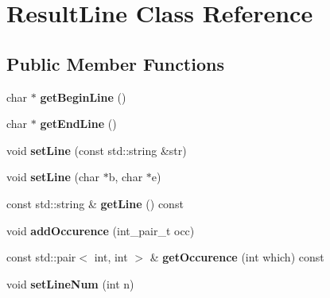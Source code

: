 \hypertarget{class_result_line}{\section{Result\-Line Class Reference}
\label{class_result_line}
}
\subsection*{Public Member Functions}
\begin{DoxyCompactItemize}
\item 
\hypertarget{class_result_line_aa8b7f90ecdf3e2e7d5399051ddaa1a29}{char $\ast$ {\bfseries get\-Begin\-Line} ()}\label{class_result_line_aa8b7f90ecdf3e2e7d5399051ddaa1a29}

\item 
\hypertarget{class_result_line_a0f10dda573d3ff9a71ec6cdaa718bd4f}{char $\ast$ {\bfseries get\-End\-Line} ()}\label{class_result_line_a0f10dda573d3ff9a71ec6cdaa718bd4f}

\item 
\hypertarget{class_result_line_a0779d1fa9dc3476982c93731ca233a88}{void {\bfseries set\-Line} (const std\-::string \&str)}\label{class_result_line_a0779d1fa9dc3476982c93731ca233a88}

\item 
\hypertarget{class_result_line_a37f1b4690a32f513da5ad6bf93b9c020}{void {\bfseries set\-Line} (char $\ast$b, char $\ast$e)}\label{class_result_line_a37f1b4690a32f513da5ad6bf93b9c020}

\item 
\hypertarget{class_result_line_aee86295b555a6be2a6dcb98f29cb92a4}{const std\-::string \& {\bfseries get\-Line} () const }\label{class_result_line_aee86295b555a6be2a6dcb98f29cb92a4}

\item 
\hypertarget{class_result_line_a1d95755fe1c3c7f23f12bf74cfdb0294}{void {\bfseries add\-Occurence} (int\-\_\-pair\-\_\-t occ)}\label{class_result_line_a1d95755fe1c3c7f23f12bf74cfdb0294}

\item 
\hypertarget{class_result_line_a025e47fa51cba8b81b8a1f7b845de3a3}{const std\-::pair$<$ int, int $>$ \& {\bfseries get\-Occurence} (int which) const }\label{class_result_line_a025e47fa51cba8b81b8a1f7b845de3a3}

\item 
\hypertarget{class_result_line_a4f02d87b5a5f0820fd4e0ad4b74472ca}{void {\bfseries set\-Line\-Num} (int n)}\label{class_result_line_a4f02d87b5a5f0820fd4e0ad4b74472ca}


\end{DoxyCompactItemize}
